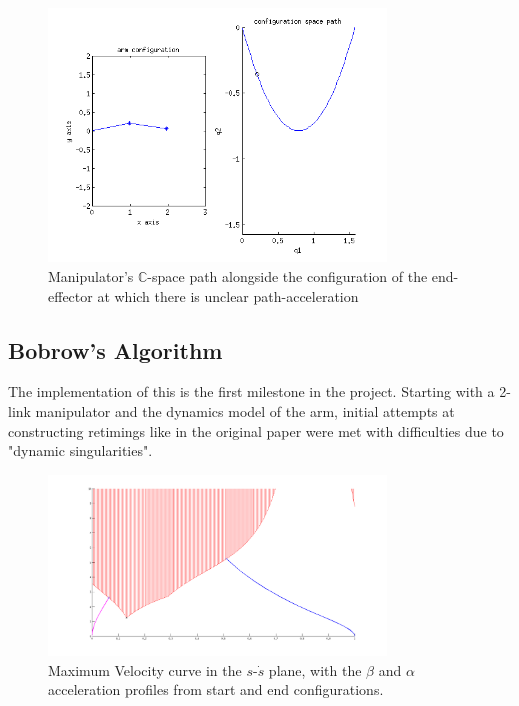 \documentclass[letterpaper,10pt]{article} %
\begin{document}
\begin{figure}[h]
\centering
\includegraphics[width=0.8\textwidth]{pics/dynamic_singularity_pose}
\caption{Manipulator's $\mathbb{C}$-space path alongside the configuration of the end-effector at which there is unclear path-acceleration}
\label{fig:dynamic_singularity}
\end{figure}

\subsection{Bobrow's Algorithm}\label{subsec:bobrow}

The implementation of this is the first milestone in the project. Starting with a 2-link manipulator and the dynamics model of the arm, initial attempts at constructing retimings like in the original paper were met with difficulties due to "dynamic singularities".

\begin{figure}[h]
\centering
\includegraphics[width=0.8\textwidth]{pics/box_constraint_mvc}
\caption{Maximum Velocity curve in the $s$-$\dot{s}$ plane, with the $\beta$ and $\alpha$ acceleration profiles from start and end configurations.}
\label{fig:box_mvc}
\end{figure}
\end{document}
